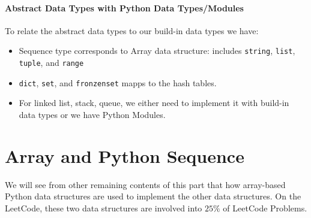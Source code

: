 \documentclass[../main.tex]{subfiles}
\begin{document}
\paragraph{Abstract Data Types with Python Data Types/Modules}
To relate the abstract data types to our build-in data types we have:
\begin{itemize}
    \item Sequence type corresponds to Array data structure: includes \texttt{string}, \texttt{list}, \texttt{tuple}, and \texttt{range}
    \item \texttt{dict}, \texttt{set}, and \texttt{fronzenset} mapps to the hash tables.
    \item For linked list, stack, queue, we either need to implement it with build-in data types or we have Python Modules. 
\end{itemize}
\section{Array and Python Sequence}
\label{chapter_array_string}
 We will see from other remaining contents of this part that how array-based Python data structures are used to implement the other data structures. On the LeetCode, these two data structures are involved into $25\%$ of LeetCode Problems. 
\end{document}
